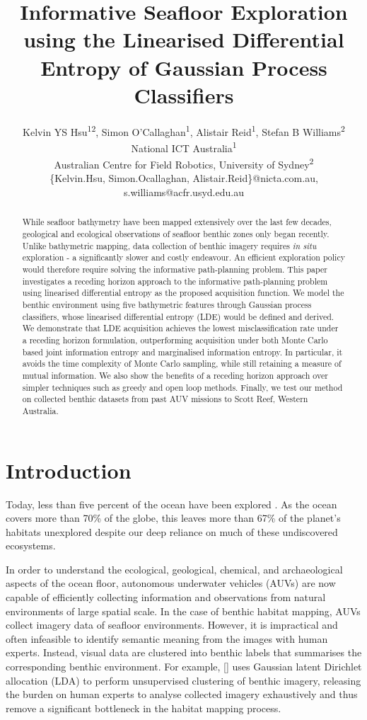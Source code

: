 \documentclass{article}
\title{Informative Seafloor Exploration using the Linearised Differential Entropy of Gaussian Process Classifiers}
\author{Kelvin YS Hsu\textsuperscript{\textnormal{12}}, Simon O'Callaghan\textsuperscript{\textnormal{1}}, Alistair Reid\textsuperscript{\textnormal{1}}, Stefan B Williams\textsuperscript{\textnormal{2}} \\ National ICT Australia\textsuperscript{1} \\ Australian Centre for Field Robotics, University of Sydney\textsuperscript{2} \\ 
\{Kelvin.Hsu, Simon.Ocallaghan, Alistair.Reid\}@nicta.com.au, s.williams@acfr.usyd.edu.au}
\newcommand{\incite}[1]{\citeauthor{#1} [\citeyear{#1}]}
\begin{document}
\maketitle

\begin{abstract}
	While seafloor bathymetry have been mapped extensively over the last few decades, geological and ecological observations of seafloor benthic zones only began recently. Unlike bathymetric mapping, data collection of benthic imagery requires \textit{in situ} exploration - a significantly slower and costly endeavour. An efficient exploration policy would therefore require solving the informative path-planning problem. This paper investigates a receding horizon approach to the informative path-planning problem using linearised differential entropy as the proposed acquisition function. We model the benthic environment using five bathymetric features through Gaussian process classifiers, whose linearised differential entropy (LDE) would be defined and derived. We demonstrate that LDE acquisition achieves the lowest misclassification rate under a receding horizon formulation, outperforming acquisition under both Monte Carlo based joint information entropy and marginalised information entropy. In particular, it avoids the time complexity of Monte Carlo sampling, while still retaining a measure of mutual information. We also show the benefits of a receding horizon approach over simpler techniques such as greedy and open loop methods. Finally, we test our method on collected benthic datasets from past AUV missions to Scott Reef, Western Australia.
\end{abstract}

\section{Introduction}
\label{Section:Introduction}

	Today, less than five percent of the ocean have been explored \cite{NOAA}. As the ocean covers more than 70\% of the globe, this leaves more than 67\% of the planet's habitats unexplored despite our deep reliance on much of these undiscovered ecosystems.
	
	In order to understand the ecological, geological, chemical, and archaeological aspects of the ocean floor, autonomous underwater vehicles (AUVs) are now capable of efficiently collecting information and observations from natural environments of large spatial scale. In the case of benthic habitat mapping, AUVs collect imagery data of seafloor environments. However, it is impractical and often infeasible to identify semantic meaning from the images with human experts. Instead, visual data are clustered into benthic labels that summarises the corresponding benthic environment. For example, \incite{Steinberg2015128} uses Gaussian latent Dirichlet allocation (LDA) to perform unsupervised clustering of benthic imagery, releasing the burden on human experts to analyse collected imagery exhaustively and thus remove a significant bottleneck in the habitat mapping process.
\end{document}
